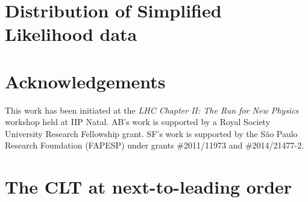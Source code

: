 \documentclass[11pt]{article}
\begin{document}




\section{Distribution of Simplified Likelihood data}



\section*{Acknowledgements}

 This work has been initiated at the \textit{LHC Chapter II: The Run for New Physics} workshop held at IIP Natal.
 AB's work is supported by a Royal Society University Research Fellowship grant.
 SF's work is supported by the S\~ao Paulo Research Foundation (FAPESP) under grants \#2011/11973 and \#2014/21477-2.


\appendix

\section{The CLT at next-to-leading order}
\label{app:skew}
\end{document}

